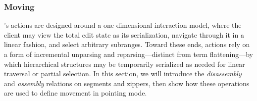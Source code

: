 



\subsubsection{Moving} \label{sec:moving}

\ty's actions are designed around
a one-dimensional interaction model, where the client may
view the total edit state as its serialization, navigate through it
in a linear fashion, and select arbitrary subranges.
Toward these ends, actions rely
on a form of incremental unparsing and reparsing---distinct
from term flattening---by which
hierarchical structures may be temporarily serialized
as needed for linear traversal or partial selection.
In this section, we will introduce the
\emph{disassembly} and \emph{assembly} relations on segments
and zippers, then show how these operations are used
to define movement in pointing mode.









